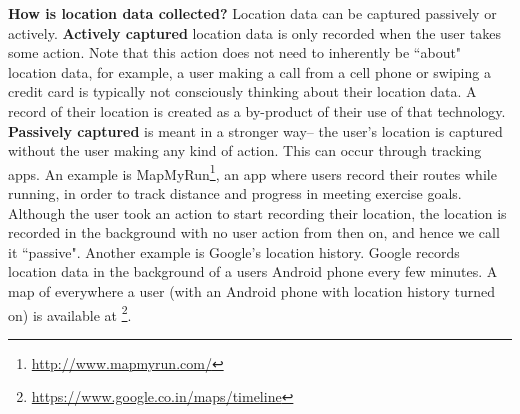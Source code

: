 \textbf{How is location data collected?}
Location data can be captured passively or actively.
\textbf{Actively captured} location data is only recorded when the user takes some action.
Note that this action does not need to inherently be ``about" location data, for example, a user making a call from a cell phone or swiping a credit card is typically not consciously thinking about their location data. 
A record of their location is created as a by-product of their use of that technology.
\textbf{Passively captured} is meant in a stronger way-- the user's location is captured without the user making any kind of action.
This can occur through tracking apps.
An example is MapMyRun\footnote{\url{http://www.mapmyrun.com/}}, an app where users record their routes while running, in order to track distance and progress in meeting exercise goals.
Although the user took an action to start recording their location, the location is recorded in the background with no user action from then on, and hence we call it ``passive".
Another example is Google's location history.
Google records location data in the background of a users Android phone every few minutes.
A map of everywhere a user (with an Android phone with location history turned on) is available at \footnote{\url{https://www.google.co.in/maps/timeline}}.












